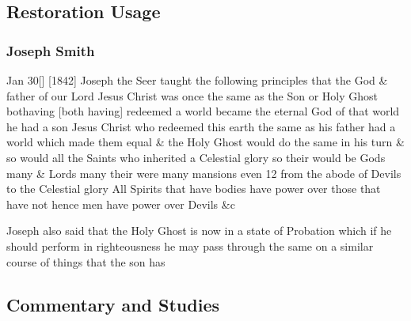 \subsection{Restoration Usage} %
	\label{HOLYGHOST-RESTORATION}

	\subsubsection{Joseph Smith} %
		\label{HOLYGHOST-JS}
	
		\begin{compactdesc}
			\item[{\hyperref[EMS-1842-JS-30-JAN-1842-WW]{30 January 1842, WW}}] Jan 30[] [1842] Joseph the Seer taught the following principles that the God \& father of our Lord Jesus Christ was once the same as the Son or Holy Ghost bothaving [both having] redeemed a world became the eternal God of that world he had a son Jesus Christ who redeemed this earth the same as his father had a world which made them equal \& the Holy Ghost would do the same in his turn \& so would all the Saints who inherited a Celestial glory so their would be Gods many \& Lords many their were many mansions even 12 from the abode of Devils to the Celestial glory All Spirits that have bodies have power over those that have not hence men have power over Devils \&c
			\item[{\hyperref[EMS-1843-JS-27-AUG-1843-FR]{27 August 1843, FR}}] Joseph also said that the Holy Ghost is now in a state of Probation which if he should perform in righteousness he may pass through the same on a similar course of things that the son has
		\end{compactdesc}
	
	
	
\subsection{Commentary and Studies} %
	\label{HOLYGHOST-COMMENTARY}

